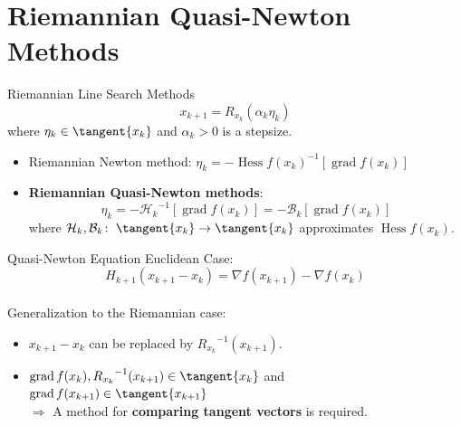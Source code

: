 \documentclass[9pt]{beamer}
\begin{document}
\section{Riemannian Quasi-Newton Methods}

\begin{frame}{Riemannian Line Search Methods}
    \begin{equation*}
        x_{k+1} = R_{x_k}(\alpha_k \eta_k)
    \end{equation*}
    where $\eta_k \in \tangent{x_k}$ and $\alpha_k > 0$ is a stepsize. \\[1.\baselineskip]
    \begin{itemize}
        \item Riemannian Newton method: $\eta_k = - {\operatorname{Hess} f(x_k)}^{-1} [\operatorname{grad} f(x_k)]$
        \item \textbf{Riemannian Quasi-Newton methods}: \begin{equation*} \eta_k = - {\mathcal{H}_k}^{-1} [\operatorname{grad} f(x_k)] = - \mathcal{B}_k [\operatorname{grad} f(x_k)] \end{equation*} where $\mathcal{H}_k, \mathcal{B}_k \colon \; \tangent{x_k} \to \tangent{x_k}$ approximates $\operatorname{Hess} f(x_k)$. 
    \end{itemize}
\end{frame}


\begin{frame}{Quasi-Newton Equation}
    Euclidean Case: 
    \begin{equation*}
        H_{k+1} (x_{k+1} - x_k) = \nabla f(x_{k+1}) - \nabla f(x_k)
    \end{equation*} \\[.5\baselineskip]
    Generalization to the Riemannian case: \\[.5\baselineskip]
    \begin{itemize}
        \item $x_{k+1} - x_k$ can be replaced by ${R_{x_k}}^{-1}(x_{k+1})$.
        \item $\operatorname{grad} f(x_k), {R_{x_k}}^{-1}(x_{k+1}) \in \tangent{x_k}$ and $\operatorname{grad} f(x_{k+1}) \in \tangent{x_{k+1}}$ \\ $\Rightarrow$ A method for \textbf{comparing tangent vectors} is required. 
    \end{itemize}
\end{frame}
\end{document}
